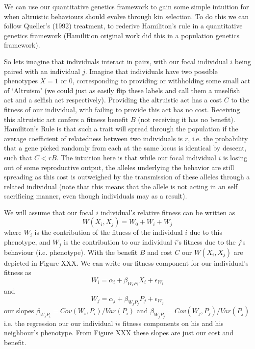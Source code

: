 We can use our quantitative genetics framework to gain some simple
intuition for when altruistic behaviours should evolve through kin selection. To do this we
can follow Queller's (1992) treatment, to rederive Hamiliton's rule in
a quantitative genetics framework (Hamilition original work did this in a
population genetics framework).

So lets imagine that individuals interact in pairs, with our focal
individual $i$ being paired with an individual $j$.  
Imagine that individuals have two possible phenotypes $X=1$ or $0$,
corresponding to providing or withholding some small act of `Altruism'
(we could just as easily flip these labels and call them a unselfish
act and a selfish act respectively). Providing the altruistic act has a cost $C$ to the fitness of our
individual, with failing to provide this act has no cost. Receiving this
altruistic act confers a fitness benefit $B$ (not receiving it has no benefit).
Hamiliton's Rule is that such a trait will spread through the
population if the average coefficient of relatedness between two
individuals is $r$, i.e. the probability that a gene picked randomly 
from each at the same locus is identical by descent, such that $C<rB$.
The intuition here is that while our focal individual $i$ is losing
out of some reproductive output, the alleles underlying the behavior
are still spreading as this cost is outweighed by the transmission of these 
alleles through a related individual (note that this means that the
allele is not acting in an self sacrificing manner, even though
individuals may as a result). 
  

We will assume that our focal $i$ individual's relative fitness can be written as 
\begin{equation}
W(X_i,X_j)= W_0 + W_i +W_j
\end{equation}
where $W_i$ is the contribution of the fitness of the individual $i$ due
to this phenotype, and $W_j$ is the contribution to our
individual $i$'s fitness due to the $j$'s behaviour (i.e. phenotype).
With the benefit $B$ and cost $C$ our $W(X_i,X_j)$ are depicted in
Figure XXX. We can write our fitness component for our individual's fitness
as 
\begin{equation}
W_i = \alpha_i + \beta_{W_i P_i} X_i + \epsilon_{W_i}
\end{equation}
and
\begin{equation}
W_j = \alpha_j + \beta_{W_j P_j} P_j + \epsilon_{W_j}
\end{equation}
our slopes $\beta_{W_i P_i} = Cov(W_i,P_i)/Var(P_i)$ and $\beta_{W_j
  P_j} = Cov(W_j,P_j)/Var(P_j)$ i.e. the regression our our individual
$i$s fitness components on his and his neighbour's phenotype. From 
Figure XXX these slopes are just our cost and benefit.

